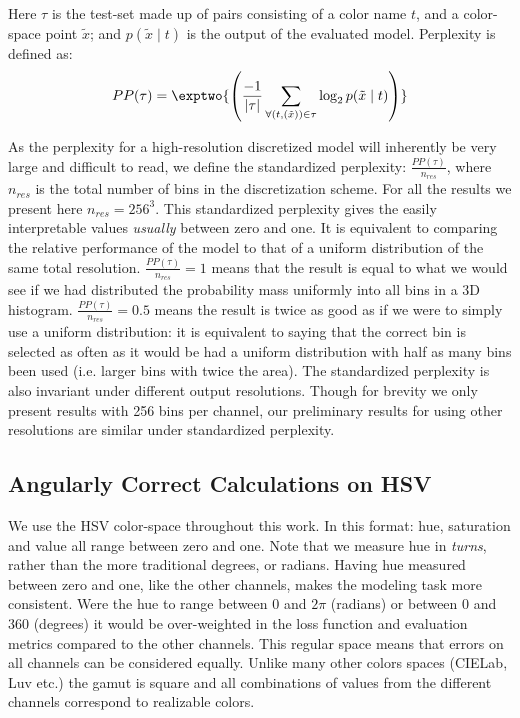 Here $\tau$ is the test-set made up of pairs consisting of a color name $t$, and a color-space point $\tilde{x}$;
and  $p(\tilde{x}\mid t)$ is the output of the evaluated model.
Perplexity is defined as:
\begin{equation}
PP(\tau{}) = \exptwo{\left(
	\frac{-1}{|\tau|} 
	\sum_{
		\forall(t,(\tilde{x})) \in \tau}
	\log_2 p(\tilde{x}\mid t)\right)}
\end{equation}

As the perplexity for a high-resolution discretized model will inherently be very large and difficult to read,
we define the standardized perplexity: $\frac{PP(\tau)}{n_{res}}$,
where $n_{res}$ is the total number of bins in the discretization scheme.
For all the results we present here $n_{res} = 256^3$.
This standardized perplexity gives the easily interpretable values \emph{usually} between zero and one.
It is equivalent to comparing the relative performance of the model to that of a uniform distribution of the same total resolution.
$\frac{PP(\tau)}{n_{res}}=1$ means that the result is equal to what we would see if we had distributed the probability mass uniformly into all bins in a 3D histogram.
$\frac{PP(\tau)}{n_{res}}=0.5$ means the result is twice as good as if we were to simply use a uniform distribution: it is equivalent to saying that the correct bin is selected as often as it would be had a uniform distribution with half as many bins been used (i.e. larger bins with twice the area).
The standardized perplexity is also invariant under different output resolutions.
Though for brevity we only  present results with 256 bins per channel, our preliminary results for using other resolutions are similar under standardized perplexity.


\subsection{Angularly Correct Calculations on HSV}\label{sec:angularly-correct}
We use the HSV color-space \parencite{smith1978color} throughout this work.
In this format: hue, saturation and value all range between zero and one.
Note that we measure hue in \emph{turns}, rather than the more traditional degrees, or radians.
Having hue measured between zero and one, like the other channels, makes the modeling task more consistent.
Were the hue to range between $0$ and $2\pi$ (radians) or between $0$ and $360$ (degrees) it would be over-weighted in the loss function and evaluation metrics compared to the other channels.
This regular space means that errors on all channels can be considered equally.
Unlike many other colors spaces (CIELab, Luv etc.) the gamut is square and all combinations of values from the different channels correspond to realizable colors.


